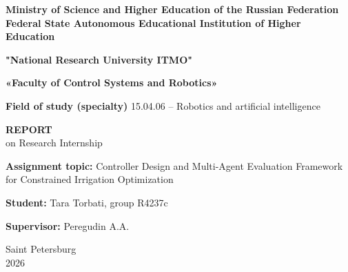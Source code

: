 \begin{titlepage}
    
    \fontsize{14pt}{18pt}\selectfont
    \centering
    
    \textbf{Ministry of Science and Higher Education of the Russian Federation}
    \\
    \textbf{Federal State Autonomous Educational Institution of Higher Education} \\
    \vspace{1.5cm}
    
    \textbf{"National Research University ITMO"}

    \vspace{2.5cm}

    \textbf{«Faculty of Control Systems and Robotics»}

    \vspace{1cm}

    \textbf{Field of study (specialty)} 15.04.06 – Robotics and artificial intelligence
    
    \vspace{2.2cm}
    
    \textbf{REPORT}
    \\
    \vspace{0.5cm}
    on Research Internship

    \vspace{1.8cm}

    \begin{flushleft}

    \textbf{Assignment topic:} Controller Design and Multi-Agent Evaluation Framework for Constrained Irrigation Optimization\\
    
    \vspace{1cm}
    
    \textbf{Student:} Tara Torbati, group R4237c    \\
    
    \vspace{1cm}
    
    \textbf{Supervisor:} Peregudin A.A.\\

    \end{flushleft}
    
    \vfill
    
    Saint Petersburg \\
    \vspace{0.5cm}
    2026
\end{titlepage}

